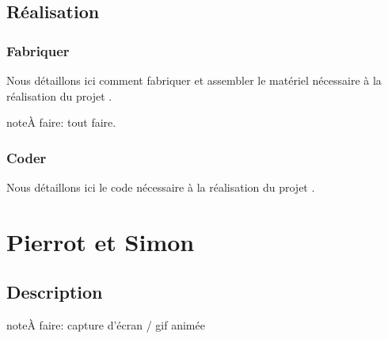 \documentclass[letterpaper,10pt,french]{sphinxmanual}
\begin{document}
\noindent{}


\subsection{Réalisation}
\label{\detokenize{projets/boite-fermee:realisation}}

\subsubsection{Fabriquer}
\label{\detokenize{projets/boite-fermee-fabriquer::doc}}\label{\detokenize{projets/boite-fermee-fabriquer:fabriquer}}
Nous détaillons ici comment fabriquer et assembler
le matériel nécessaire à la réalisation du projet
.

\begin{sphinxadmonition}{note}{\label{projets/boite-fermee-fabriquer:index-0}À faire:}
tout faire.
\end{sphinxadmonition}

\ignorespaces 

\subsubsection{Coder}
\label{\detokenize{projets/boite-fermee-coder:index-0}}\label{\detokenize{projets/boite-fermee-coder:coder}}\label{\detokenize{projets/boite-fermee-coder::doc}}
Nous détaillons ici le code nécessaire à la réalisation
du projet .



\section{Pierrot et Simon}
\label{\detokenize{projets/pierrot:projetpierrot}}\label{\detokenize{projets/pierrot:pierrot-et-simon}}\label{\detokenize{projets/pierrot::doc}}

\subsection{Description}
\label{\detokenize{projets/pierrot:description}}
\begin{sphinxadmonition}{note}{\label{projets/pierrot:index-0}À faire:}
capture d’écran / gif animée
\end{sphinxadmonition}
\end{document}
